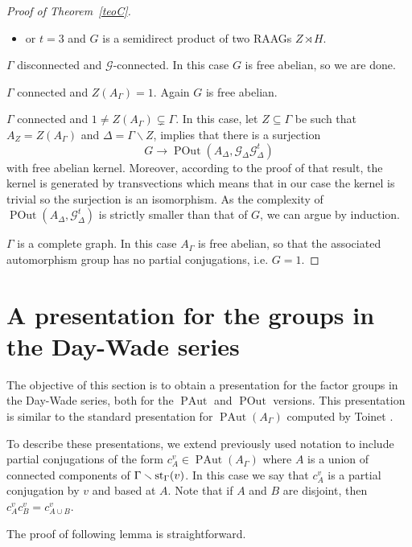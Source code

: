 \documentclass[10pt]{amsart}
\theoremstyle{definition}
\newcommand{\st}{{\rm st}}
\newcommand{\PAut}{\operatorname{PAut}}
\newcommand{\POut}{\operatorname {POut}}
\theoremstyle{definition}
\numberwithin{equation}{section}
\begin{document}
\begin{proof}[Proof of Theorem~\ref{teoC}]
\begin{itemize}
\item or $t=3$ and $G$ is a semidirect product of two RAAGs $Z\rtimes H$.
\end{itemize}



\medskip
  $\Gamma$ disconnected and $\mathcal{G}$-connected. In this case $G$ is free abelian, so we are done.


\medskip
  $\Gamma$ connected and $Z(A_\Gamma)=1$. Again $G$ is free abelian.


\medskip
  $\Gamma$ connected and $1\neq Z(A_\Gamma)\subsetneq\Gamma$. In this case, let $Z\subseteq\Gamma$ be such that $A_Z=Z(A_\Gamma)$ and $\Delta=\Gamma\smallsetminus Z$, \cite[Proposition 5.6]{DayWade} implies that there is a surjection
\[G\to\POut(A_\Delta,\mathcal{G}_\Delta\mathcal{G}^t_\Delta)\]
 with free abelian kernel. Moreover, according to the proof of that result, the kernel is generated by transvections which means that in our case the kernel is trivial so the surjection is an isomorphism.  As the complexity of $\POut(A_\Delta,\mathcal{G}^t_\Delta)$ is strictly smaller than that of $G$, we can argue by induction.
  

\medskip
  $\Gamma$ is a complete graph. In this case $A_\Gamma$ is free abelian, so that the associated automorphism group has no partial conjugations, i.e. $G=1$.
 \end{proof}
  
\section{A presentation for the groups in the Day-Wade series}\label{sec:presentation}
The objective of this section is to obtain a presentation for the factor groups in the Day-Wade series, both for the $\PAut$ and $\POut$ versions. This presentation is similar to the standard presentation for $\PAut(A_\Gamma)$ computed by Toinet \cite{Toinet}.


To describe these presentations, we extend previously used notation  to include partial conjugations of the form $c_A^v\in\PAut(A_\Gamma)$ where $A$ is a union of connected components of $\Gamma\smallsetminus\st_\Gamma(v)$. In this case we say that $c_A^v$ is a partial conjugation by $v$ and based at $A$.
Note that if $A$ and $B$ are disjoint, then $c_A^vc_B^v=c_{A\cup B}^v$.

The proof of following lemma is straightforward.
 
\end{document}
